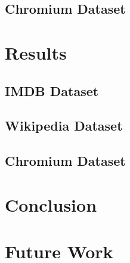\documentclass[11pt]{article}
\begin{document}
\subsection*{Chromium Dataset}

\section*{Results}

\subsection*{IMDB Dataset}

\subsection*{Wikipedia Dataset}

\subsection*{Chromium Dataset}

\section*{Conclusion}

\section*{Future Work}

\printbibliography
\end{document}
